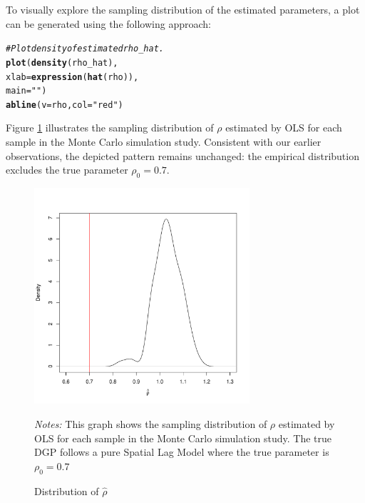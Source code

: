 \documentclass[english,12pt]{book}\usepackage[]{graphicx}\usepackage[]{xcolor}
\makeatletter
\newcommand{\hlsng}[1]{\textcolor[rgb]{0.192,0.494,0.8}{#1}}%
\newcommand{\hlcom}[1]{\textcolor[rgb]{0.678,0.584,0.686}{\textit{#1}}}%
\newcommand{\hldef}[1]{\textcolor[rgb]{0.345,0.345,0.345}{#1}}%
\newcommand{\hlkwc}[1]{\textcolor[rgb]{0.333,0.667,0.333}{#1}}%
\newcommand{\hlkwd}[1]{\textcolor[rgb]{0.737,0.353,0.396}{\textbf{#1}}}%
\newenvironment{kframe}{%
 \def\at@end@of@kframe{}%
 \ifinner\ifhmode%
  \def\at@end@of@kframe{\end{minipage}}%
  \begin{minipage}{\columnwidth}%
 \fi\fi%
 \def\FrameCommand##1{\hskip\@totalleftmargin \hskip-\fboxsep
 \colorbox{shadecolor}{##1}\hskip-\fboxsep
     \hskip-\linewidth \hskip-\@totalleftmargin \hskip\columnwidth}%
 \MakeFramed {\advance\hsize-\width
   \@totalleftmargin\z@ \linewidth\hsize
   \@setminipage}}%
 {\par\unskip\endMakeFramed%
 \at@end@of@kframe}
\newenvironment{knitrout}{}{} %
\makeatother
\begin{document}
To visually explore the sampling distribution of the estimated parameters, a plot can be generated using the following approach:
\begin{knitrout}
\color{fgcolor}\begin{kframe}
\begin{alltt}
\hlcom{# Plot density of estimated rho_hat. }
\hlkwd{plot}\hldef{(}\hlkwd{density}\hldef{(rho_hat),}
     \hlkwc{xlab} \hldef{=} \hlkwd{expression}\hldef{(}\hlkwd{hat}\hldef{(rho)),}
     \hlkwc{main} \hldef{=} \hlsng{""}\hldef{)}
\hlkwd{abline}\hldef{(}\hlkwc{v} \hldef{= rho,} \hlkwc{col} \hldef{=} \hlsng{"red"}\hldef{)}
\end{alltt}
\end{kframe}
\end{knitrout}

Figure \ref{fig:ols-rho-sim} illustrates the sampling distribution of $\rho$ estimated by OLS for each sample in the Monte Carlo simulation study. Consistent with our earlier observations, the depicted pattern remains unchanged: the empirical distribution excludes the true parameter $\rho_0 = 0.7$.

\begin{figure}[ht]
  \caption{Distribution of $\widehat{\rho}$}
    \label{fig:ols-rho-sim}
    \centering 
	\begin{minipage}{.9\linewidth}
\begin{knitrout}
\color{fgcolor}

{\centering \includegraphics[width=8cm,height=8cm]{figure/ols-rho-sim-1} 

}


\end{knitrout}
\footnotesize
		\emph{Notes:} This graph shows the sampling distribution of $\rho$ estimated by OLS for each sample in the Monte Carlo simulation study. The true DGP follows a pure Spatial Lag Model where the true parameter is $\rho_0 = 0.7$
	\end{minipage}	
\end{figure}
\end{document}
